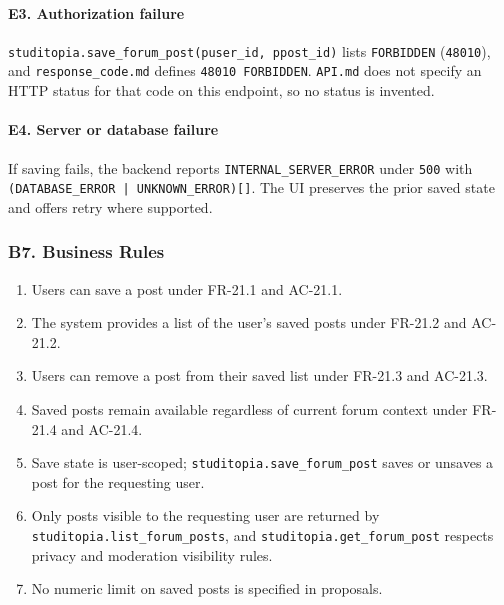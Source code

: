 \documentclass[12pt]{article}
\begin{document}
\hypertarget{sec:e3-authorization-failure}{}
\paragraph*{E3. Authorization failure}
\par\medskip

\texttt{studitopia.save\_forum\_post(puser\_id, ppost\_id)} lists \texttt{FORBIDDEN} (\texttt{48010}), and \texttt{response\_code.md} defines \texttt{48010 FORBIDDEN}. \texttt{API.md} does not specify an HTTP status for that code on this endpoint, so no status is invented.
\par\medskip

\hypertarget{sec:e4-server-or-database-failure}{}
\paragraph*{E4. Server or database failure}
\par\medskip

If saving fails, the backend reports \texttt{INTERNAL\_SERVER\_ERROR} under \texttt{500} with \texttt{(DATABASE\_ERROR | UNKNOWN\_ERROR)[]}. The UI preserves the prior saved state and offers retry where supported.
\par\medskip

\hypertarget{sec:b7-business-rules}{}
\subsubsection*{B7. Business Rules}
\par\medskip

\begin{enumerate}
\item Users can save a post under FR-21.1 and AC-21.1.
\item The system provides a list of the user's saved posts under FR-21.2 and AC-21.2.
\item Users can remove a post from their saved list under FR-21.3 and AC-21.3.
\item Saved posts remain available regardless of current forum context under FR-21.4 and AC-21.4.
\item Save state is user-scoped; \texttt{studitopia.save\_forum\_post} saves or unsaves a post for the requesting user.
\item Only posts visible to the requesting user are returned by \texttt{studitopia.list\_forum\_posts}, and \texttt{studitopia.get\_forum\_post} respects privacy and moderation visibility rules.
\item No numeric limit on saved posts is specified in proposals.
\end{enumerate}
\par\medskip
\end{document}
